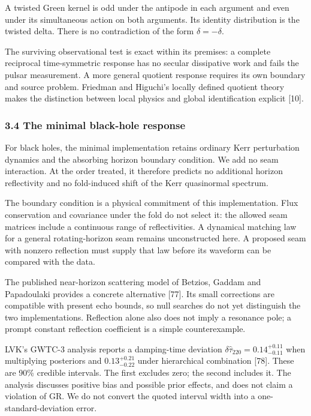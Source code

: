\documentclass[
]{article}
\begin{document}
A twisted Green kernel is odd under the antipode in each argument and
even under its simultaneous action on both arguments. Its identity
distribution is the twisted delta. There is no contradiction of the form
\(\delta=-\delta\).

The surviving observational test is exact within its premises: a
complete reciprocal time-symmetric response has no secular dissipative
work and fails the pulsar measurement. A more general quotient response
requires its own boundary and source problem. Friedman and Higuchi's
locally defined quotient theory makes the distinction between local
physics and global identification explicit {[}10{]}.

\subsubsection{3.4 The minimal black-hole
response}\label{the-minimal-black-hole-response}

For black holes, the minimal implementation retains ordinary Kerr
perturbation dynamics and the absorbing horizon boundary condition. We
add no seam interaction. At the order treated, it therefore predicts no
additional horizon reflectivity and no fold-induced shift of the Kerr
quasinormal spectrum.

The boundary condition is a physical commitment of this implementation.
Flux conservation and covariance under the fold do not select it: the
allowed seam matrices include a continuous range of reflectivities. A
dynamical matching law for a general rotating-horizon seam remains
unconstructed here. A proposed seam with nonzero reflection must supply
that law before its waveform can be compared with the data.

The published near-horizon scattering model of Betzios, Gaddam and
Papadoulaki provides a concrete alternative {[}77{]}. Its small
corrections are compatible with present echo bounds, so null searches do
not yet distinguish the two implementations. Reflection alone also does
not imply a resonance pole; a prompt constant reflection coefficient is
a simple counterexample.

LVK's GWTC-3 analysis reports a damping-time deviation
\(\delta\hat\tau_{220}=0.14^{+0.11}_{-0.11}\) when multiplying
posteriors and \(0.13^{+0.21}_{-0.22}\) under hierarchical combination
{[}78{]}. These are 90\% credible intervals. The first excludes zero;
the second includes it. The analysis discusses positive bias and
possible prior effects, and does not claim a violation of GR. We do not
convert the quoted interval width into a one-standard-deviation error.
\end{document}
